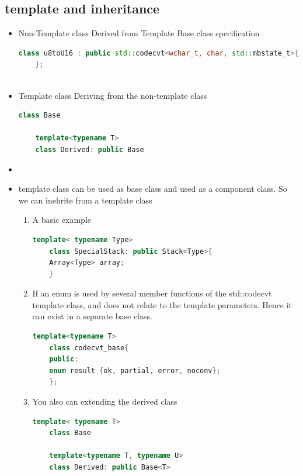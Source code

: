 \documentclass[a4paper,12pt,twoside]{book}
\begin{document}
\subsection{template and inheritance}

\begin{itemize}
	
	\item Non-Template class Derived from Template Base class specification

	\begin{lstlisting}[frame=single, language=c++]
	class u8toU16 : public std::codecvt<wchar_t, char, std::mbstate_t>{
	};
	
	\end{lstlisting}

	
	\item Template class Deriving from the non-template class
	\begin{lstlisting}[frame=single, language=c++]
	class Base
	
	template<typename T>
	class Derived: public Base
	\end{lstlisting}	
	
	\item \item template class can be used as base class and used as a component class. So we can inehrite from a template class
\begin{enumerate}
	\item A basic example
	\begin{lstlisting}[frame=single, language=c++]
	template< typename Type>
	class SpecialStack: public Stack<Type>{
	Array<Type> array;
	}
	\end{lstlisting}	
	
	\item If an enum is used by several member functions of the std::codecvt template class, and does not relate to the template parameters. Hence it can exist in a separate base class.
	
	\begin{lstlisting}[frame=single, language=c++]
	template<typename T>
	class codecvt_base{
	public:
	enum result {ok, partial, error, noconv};
	};
	\end{lstlisting}
	
	\item You also can extending the derived class
	\begin{lstlisting}[frame=single, language=c++]
	template< typename T>
	class Base
	
	template<typename T, typename U>
	class Derived: public Base<T>
	\end{lstlisting}
	

\end{enumerate}
\end{itemize}
\end{document}
